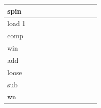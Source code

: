 \documentclass{article}[10 pt,landscape]
\begin{document}
\begin{landscape}
{\begin{tabular}{l|l|l|l|l|l|l|l|l|l|l}
            spin  &       &       &       &           &         &       &       &        &       & \\ \hline
            load 1&       &       &       &           &         &       &       &        &       & \\ \hline
            comp  &       &       &       &           &         &       &       &        &       & \\ \hline
            win   &       &       &       &           &         &       &       &        &       & \\ \hline
            add   &       &       &       &           &         &       &       &        &       & \\ \hline
            loose &       &       &       &           &         &       &       &        &       & \\ \hline
            sub &       &       &       &           &         &       &       &        &       & \\ \hline
            wn    &       &       &       &           &         &       &       &        &       & \\
        \end{tabular}
    }
\end{landscape}
\end{document}
